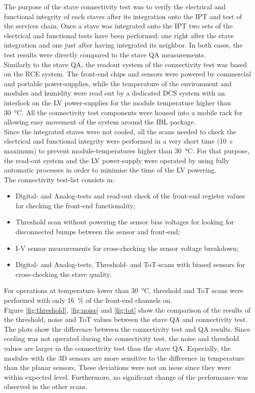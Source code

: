 The purpose of the stave connectivity test was to verify the electrical and functional integrity of each staves after its integration onto the IPT and test of the services chain. Once a stave was integrated onto the IPT two sets of the electrical and functional tests have been performed: one right after the stave integration and one just after having integrated its neighbor. In both cases, the test results were directly compared to the stave QA measurements.\\
Similarly to the stave QA, the readout system of the connectivity test was based on the RCE system. The front-end chips and sensors were powered by commercial and portable power-supplies, while the temperature of the environment and modules and humidity were read out by a dedicated DCS system with an interlock on the LV power-supplies for the module temperature higher than \SI{30}{\celsius}. All the connectivity test components were housed into a mobile rack for allowing easy movement of the system around the IBL package.\\
Since the integrated staves were not cooled, all the scans needed to check the electrical and functional integrity were performed in a very short time (\SI{10}{\second} maximum) to prevent module-temperatures higher than \SI{30}{\celsius}. For that purpose, the read-out system and the LV power-supply were operated by using fully automatic processes in order to minimise the time of the LV powering. \\
The connectivity test-list consists in:
\begin{itemize}
 \item Digital- and Analog-tests and read-out check of the front-end register values for checking the front-end functionality;
 \item Threshold scan without powering the sensor bias voltages for looking for disconnected bumps between the sensor and front-end;
 \item I-V sensor measurements for cross-checking the sensor voltage breakdown;
 \item Digital- and Analog-tests, Threshold- and ToT-scans with biased sensors for cross-checking the stave quality.
\end{itemize}
For operations at temperature lower than \SI{30}{\celsius}, threshold and ToT scans were performed with only \SI{16}{\percent} of the front-end channels on.\\
Figure \ref{fig:threshold}, \ref{fig:noise} and \ref{fig:tot} show the comparison of the results of the threshold, noise and ToT values between the stave QA and connectivity test. The plots show the difference between the connectivity test and QA results. Since cooling was not operated during the connectivity test, the noise and threshold values are larger in the connectivity test than the stave QA. Especially, the modules with the 3D sensors are more sensitive to the difference in temperature than the planar sensors. These deviations were not an issue since they were within expected level. Furthermore, no significant change of the performance was observed in the other scans.\\
